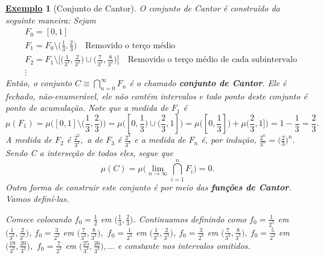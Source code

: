 \documentclass{article}
\newtheorem{example}{\underline{Exemplo}}
\begin{document}
\begin{example}[Conjunto de Cantor]
	O conjunto de Cantor é construído da seguinte maneira: Sejam
	\begin{align*}
		 & F_{0} = [0, 1]                                                                                                                                                                                  \\
		 & F_{1} = F_{0}\setminus{\biggl(\frac{1}{3}, \frac{2}{3}\biggr)}\quad \text{Removido o terço médio}                                                                                               \\
		 & F_{2} = F_{1}\setminus{\biggl[\biggl(\frac{1}{3^{2}}, \frac{2}{3^{2}}\biggr)\cup \biggl(\frac{7}{3^{2}}, \frac{8}{3^{2}}\biggr)\biggr]}\quad \text{Removido o terço médio de cada subintervalo} \\
		 & \vdots
	\end{align*}
	Então, o conjunto \(C\equiv \bigcap_{n=0}^{\infty}F_{n}\) é o chamado \textbf{conjunto de Cantor}. Ele é fechado, não-enumerável, ele não contém intervalos e todo ponto deste conjunto é ponto de acumulação.
	Note que a medida de \(F_{1}\) é
	\[
		\mu (F_{1}) = \mu \biggl([0, 1]\setminus{\biggl(\frac{1}{3}, \frac{2}{3}\biggr)}\biggr) = \mu \biggl([0, \frac{1}{3})\cup (\frac{2}{3}, 1]\biggr) = \mu \biggl([0, \frac{1}{3}]\biggr) + \mu \biggl(\frac{2}{3}, 1]\biggr) = 1-\frac{1}{3} = \frac{2}{3}.
	\]
	A medida de \(F_{2}\) é \(\frac{2^{2}}{3^{2}},\) a de \(F_{3}\) é \(\frac{2^{3}}{3^{3}}\) e a medida de \(F_{n}\) é, por indução, \(\frac{2^{n}}{3^{n}} = \biggl(\frac{2}{3}\biggr)^{n}.\) Sendo C a interseção de todos eles, segue que
	\[
		\mu (C) = \mu \biggl(\lim_{n\to \infty}\bigcap_{i=1}^{n}F_{i}\biggr) = 0.
	\]
  Outra forma de construir este conjunto é por meio das \textbf{funções de Cantor}. Vamos definí-las. 

  Comece colocando \(f_{0} = \frac{1}{2}\) em \(\biggl(\frac{1}{3}, \frac{2}{3}\biggr)\). Continuamos definindo como \(f_{0} = \frac{1}{2^{3}}\) em \(\biggl(\frac{1}{3^{2}}, \frac{2}{3^{2}}\biggr)\), \(f_{0}=\frac{3}{2^{2}}\) em \(\biggl(\frac{7}{3^{2}}, \frac{8}{3^{2}}\biggr),\)
 \(f_{0} = \frac{1}{2^{3}}\) em \(\biggl(\frac{1}{3^{3}}, \frac{2}{3^{3}}\biggr)\), \(f_{0} = \frac{3}{2^{3}}\) em \(\biggl(\frac{7}{3^{3}}, \frac{8}{3^{3}}\biggr)\), \(f_{0} = \frac{5}{2^{3}}\) em \(\biggl(\frac{19}{3^{2}}, \frac{20}{3^{3}}\biggr),\) \(f_{0} = \frac{7}{2^{3}}\) 
 em \(\biggl(\frac{25}{3^{3}}, \frac{26}{3^{3}}\biggr), \dotsc \) e constante nos intervalos omitidos. 


\end{example}
\end{document}
